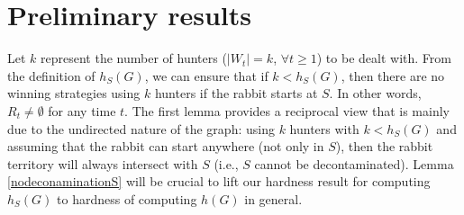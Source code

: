 \documentclass[runningheads]{llncs}
\begin{document}



\section{Preliminary results}

Let $k$ represent the number of hunters ($|W_t| = k$, $\forall t \geq 1$) to be dealt with. From the definition of $h_S(G)$, we can ensure that if $k<h_S(G)$, then there are no  winning strategies using $k$ hunters if the rabbit starts at $S$. In other words, $R_t \neq \emptyset$ for any time $t$.  
The first lemma provides a reciprocal view that is mainly due to the undirected nature of the graph: using $k$ hunters with $k <h_S(G)$ and assuming that the rabbit can start anywhere (not only in $S$), then the rabbit territory will always intersect with $S$ (i.e., $S$ cannot be decontaminated). {Lemma \ref{nodeconaminationS} will be crucial to lift our hardness result  for computing $h_S(G)$ to hardness of computing $h(G)$ in general.}
\end{document}
